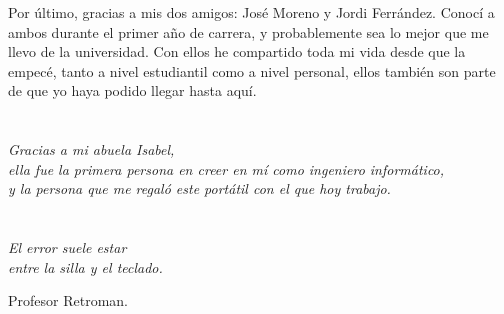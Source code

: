 Por último, gracias a mis dos amigos: José Moreno y Jordi Ferrández. Conocí a ambos durante el primer año de carrera, y probablemente sea lo mejor que me llevo de la universidad. Con ellos he compartido toda mi vida desde que la empecé, tanto a nivel estudiantil como a nivel personal, ellos también son parte de que yo haya podido llegar hasta aquí.

\cleardoublepage %
\chapter*{}
\setlength{\leftmargin}{0.5\textwidth}
\setlength{\parsep}{0cm}
\addtolength{\topsep}{0.5cm}
\begin{flushright}
\small\em{
Gracias a mi abuela Isabel,\\
ella fue la primera persona en creer en mí como ingeniero informático,\\
y la persona que me regaló este portátil con el que hoy trabajo.
}
\end{flushright}


\cleardoublepage %
\chapter*{}
\setlength{\leftmargin}{0.5\textwidth}
\setlength{\parsep}{0cm}
\addtolength{\topsep}{0.5cm}
\begin{flushright}
\small\em{
El error suele estar\\
entre la silla y el teclado. 
}
\end{flushright}
\begin{flushright}
\small{
Profesor Retroman.
}
\end{flushright}
\cleardoublepage %
